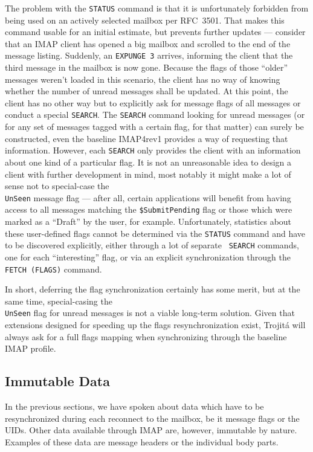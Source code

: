 \documentclass[trojita]{subfiles}
\begin{document}
The problem with the {\tt STATUS} command is that it is unfortunately forbidden from being used on an actively selected
mailbox per RFC~3501.  That makes this command usable for an initial estimate, but prevents further updates --- consider
that an IMAP client has opened a big mailbox and scrolled to the end of the message listing.  Suddenly, an {\tt *
EXPUNGE 3} arrives, informing the client that the third message in the mailbox is now gone.  Because the flags of those
``older'' messages weren't loaded in this scenario, the client has no way of knowing whether the number of unread
messages shall be updated.  At this point, the client has no other way but to explicitly ask for message flags of all
messages or conduct a special {\tt SEARCH}.  The {\tt SEARCH} command looking for unread messages (or for any set of
messages tagged with a certain flag, for that matter) can surely be constructed, even the baseline IMAP4rev1 provides a
way of requesting that information.  However, each {\tt SEARCH} only provides the client with an information about one
kind of a particular flag.  It is not an unreasonable idea to design a client with further development in mind, most
notably it might make a lot of sense not to special-case the {\tt \\UnSeen} message flag --- after all, certain
applications will benefit from having access to all messages matching the {\tt \$SubmitPending} flag or those which were
marked as a ``Draft'' by the user, for example.  Unfortunately, statistics about these user-defined flags cannot be
determined via the {\tt STATUS} command and have to be discovered explicitly, either through a lot of separate {\tt
SEARCH} commands, one for each ``interesting'' flag, or via an explicit synchronization through the {\tt FETCH (FLAGS)}
command.

In short, deferring the flag synchronization certainly has some merit, but at the same time, special-casing the {\tt
\\UnSeen} flag for unread messages is not a viable long-term solution.  Given that extensions designed for speeding up
the flags resynchronization exist, Trojitá will always ask for a full flags mapping when synchronizing through the
baseline IMAP profile.

\subsection{Immutable Data}
\label{sec:imap-immutable-data}

In the previous sections, we have spoken about data which have to be resynchronized during each reconnect to the
mailbox, be it message flags or the UIDs.  Other data available through IMAP are, however, immutable by nature.
Examples of these data are message headers or the individual body parts.
\end{document}
